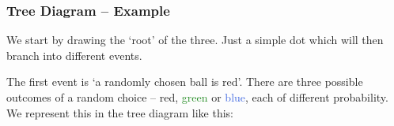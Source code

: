 \documentclass[aspectratio=169,11pt,usenames,dvipsnames,handout]{beamer}
\newcommand{\clr}{\textcolor{BrickRed}}
\newcommand{\clb}{\textcolor{RoyalBlue}}
\newcommand{\clg}{\textcolor{ForestGreen}}
\begin{document}
\begin{frame}
 \frametitle{Tree Diagram -- Example}
 We start by drawing the `root' of the three. Just a simple dot which will then
 branch into different events.
 \vspace*{-2em}
 \begin{center}
 \end{center}
 \pause
 The first event is `a randomly chosen ball is \clr{red}'. There are three
 possible outcomes of a random choice -- \clr{red}, \clg{green} or \clb{blue},
 each of different probability.\\
 \pause
 We represent this in the tree diagram like this:
 \vspace*{-1em}
 \begin{center}
 \end{center}
\end{frame}
\end{document}
